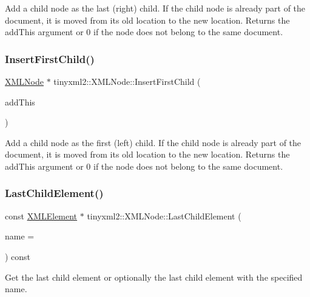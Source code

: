 Add a child node as the last (right) child. If the child node is already part of the document, it is moved from its old location to the new location. Returns the add\+This argument or 0 if the node does not belong to the same document. \mbox{\label{classtinyxml2_1_1_x_m_l_node_ac609a8f3ea949027f439280c640bbaf2}} 
\subsubsection{\texorpdfstring{Insert\+First\+Child()}{InsertFirstChild()}}
{\footnotesize\ttfamily \mbox{\hyperlink{classtinyxml2_1_1_x_m_l_node}{X\+M\+L\+Node}} $\ast$ tinyxml2\+::\+X\+M\+L\+Node\+::\+Insert\+First\+Child (\begin{DoxyParamCaption}\item[{\mbox{\hyperlink{classtinyxml2_1_1_x_m_l_node}{X\+M\+L\+Node}} $\ast$}]{add\+This }\end{DoxyParamCaption})}

Add a child node as the first (left) child. If the child node is already part of the document, it is moved from its old location to the new location. Returns the add\+This argument or 0 if the node does not belong to the same document. \mbox{\label{classtinyxml2_1_1_x_m_l_node_a609e02f02044f39b928d1a3e0de9f532}} 
\subsubsection{\texorpdfstring{Last\+Child\+Element()}{LastChildElement()}}
{\footnotesize\ttfamily const \mbox{\hyperlink{classtinyxml2_1_1_x_m_l_element}{X\+M\+L\+Element}} $\ast$ tinyxml2\+::\+X\+M\+L\+Node\+::\+Last\+Child\+Element (\begin{DoxyParamCaption}\item[{const char $\ast$}]{name = {} }\end{DoxyParamCaption}) const}

Get the last child element or optionally the last child element with the specified name. \mbox{\label{classtinyxml2_1_1_x_m_l_node_a002978fc889cc011d143185f2377eca2}} 
